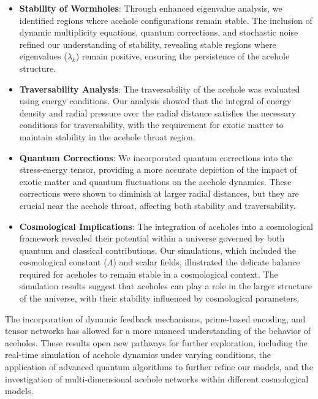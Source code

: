 \documentclass{article}
\theoremstyle{plain}
\begin{document}
\begin{itemize}
\begin{itemize}
\begin{itemize}
    \item \textbf{Stability of Wormholes}: Through enhanced eigenvalue analysis, we identified regions where acehole configurations remain stable. The inclusion of dynamic multiplicity equations, quantum corrections, and stochastic noise refined our understanding of stability, revealing stable regions where eigenvalues (\(\lambda_k\)) remain positive, ensuring the persistence of the acehole structure.
    \item \textbf{Traversability Analysis}: The traversability of the acehole was evaluated using energy conditions. Our analysis showed that the integral of energy density and radial pressure over the radial distance satisfies the necessary conditions for traversability, with the requirement for exotic matter to maintain stability in the acehole throat region.
    \item \textbf{Quantum Corrections}: We incorporated quantum corrections into the stress-energy tensor, providing a more accurate depiction of the impact of exotic matter and quantum fluctuations on the acehole dynamics. These corrections were shown to diminish at larger radial distances, but they are crucial near the acehole throat, affecting both stability and traversability.
    \item \textbf{Cosmological Implications}: The integration of aceholes into a cosmological framework revealed their potential within a universe governed by both quantum and classical contributions. Our simulations, which included the cosmological constant (\(\Lambda\)) and scalar fields, illustrated the delicate balance required for aceholes to remain stable in a cosmological context. The simulation results suggest that aceholes can play a role in the larger structure of the universe, with their stability influenced by cosmological parameters.
\end{itemize}

The incorporation of dynamic feedback mechanisms, prime-based encoding, and tensor networks has allowed for a more nuanced understanding of the behavior of aceholes. These results open new pathways for further exploration, including the real-time simulation of acehole dynamics under varying conditions, the application of advanced quantum algorithms to further refine our models, and the investigation of multi-dimensional acehole networks within different cosmological models.


\end{itemize}
\end{itemize}
\end{document}

